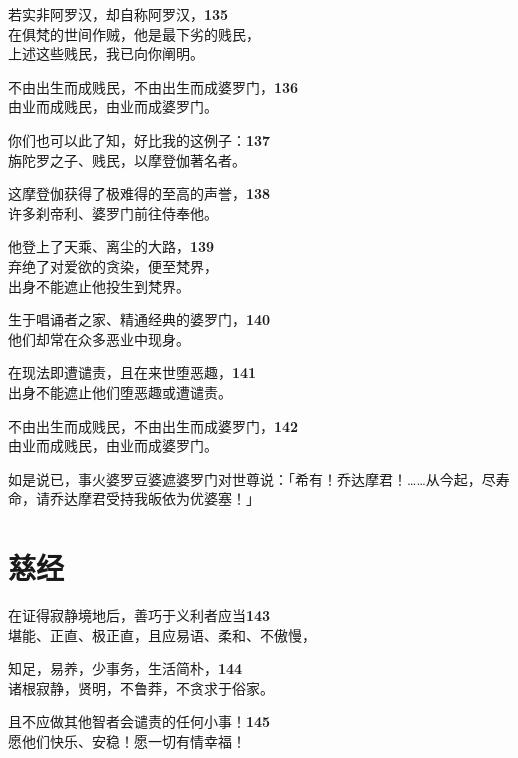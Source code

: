 若实非阿罗汉，却自称阿罗汉，\hfill{\grayfootnotesize \textbf{135}} \\
在俱梵的世间作贼，他是最下劣的贱民，\\
上述这些贱民，我已向你阐明。


不由出生而成贱民，不由出生而成婆罗门，\hfill{\grayfootnotesize \textbf{136}} \\
由业而成贱民，由业而成婆罗门。


你们也可以此了知，好比我的这例子：\hfill{\grayfootnotesize \textbf{137}} \\
旃陀罗之子、贱民，以摩登伽著名者。


这摩登伽获得了极难得的至高的声誉，\hfill{\grayfootnotesize \textbf{138}} \\
许多刹帝利、婆罗门前往侍奉他。


他登上了天乘、离尘的大路，\hfill{\grayfootnotesize \textbf{139}} \\
弃绝了对爱欲的贪染，便至梵界，\\
出身不能遮止他投生到梵界。


生于唱诵者之家、精通经典的婆罗门，\hfill{\grayfootnotesize \textbf{140}} \\
他们却常在众多恶业中现身。


在现法即遭谴责，且在来世堕恶趣，\hfill{\grayfootnotesize \textbf{141}} \\
出身不能遮止他们堕恶趣或遭谴责。


不由出生而成贱民，不由出生而成婆罗门，\hfill{\grayfootnotesize \textbf{142}} \\
由业而成贱民，由业而成婆罗门。


如是说已，事火婆罗豆婆遮婆罗门对世尊说：「希有！乔达摩君！……从今起，尽寿命，请乔达摩君受持我皈依为优婆塞！」


\section{慈经}


在证得寂静境地后，善巧于义利者应当\hfill{\grayfootnotesize \textbf{143}} \\
堪能、正直、极正直，且应易语、柔和、不傲慢，


知足，易养，少事务，生活简朴，\hfill{\grayfootnotesize \textbf{144}} \\
诸根寂静，贤明，不鲁莽，不贪求于俗家。


且不应做其他智者会谴责的任何小事！\hfill{\grayfootnotesize \textbf{145}} \\
愿他们快乐、安稳！愿一切有情幸福！


